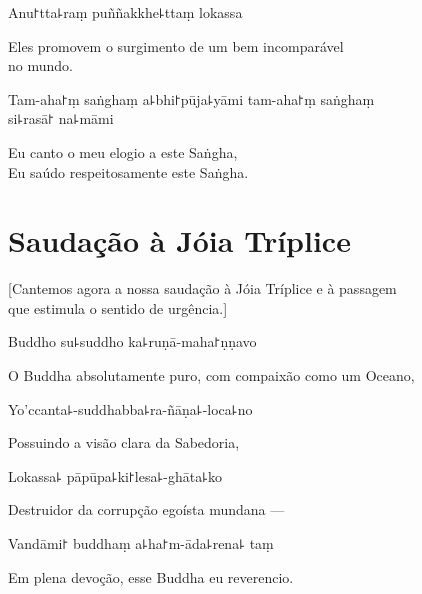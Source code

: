 Anu꜓tta꜕raṃ puññakkhe꜕ttaṃ lokassa

\begin{english}
  Eles promovem o surgimento de um bem incomparável\\ no mundo.
\end{english}

Tam-aha꜓ṃ saṅghaṃ a꜕bhi꜓pūja꜕yāmi tam-aha꜓ṃ saṅghaṃ\\ si꜕rasā꜓ na꜕māmi

\begin{english}
  Eu canto o meu elogio a este Saṅgha,\\
  Eu saúdo respeitosamente este Saṅgha.
\end{english}

\clearpage

\chapter{Saudação à Jóia Tríplice}

\begin{leader}
\end{leader}

\begin{english}
  [Cantemos agora a nossa saudação à Jóia Tríplice e à passagem \\que estimula o sentido de urgência.]
\end{english}

Buddho su꜕suddho ka꜕ruṇā-maha꜓ṇṇavo

\begin{english}
  O Buddha absolutamente puro, com compaixão como um Oceano,
\end{english}

Yo'ccanta꜕-suddhabba꜕ra-ñāṇa꜕-loca꜕no

\begin{english}
 Possuindo a visão clara da Sabedoria,
\end{english}

Lokassa꜕ pāpūpa꜕ki꜓lesa꜕-ghāta꜕ko

\begin{english}
  Destruidor da corrupção egoísta mundana ---
\end{english}

Vandāmi꜓ buddhaṃ a꜕ha꜓m-āda꜕rena꜕ taṃ

\begin{english}
  Em plena devoção, esse Buddha eu reverencio.
\end{english}

